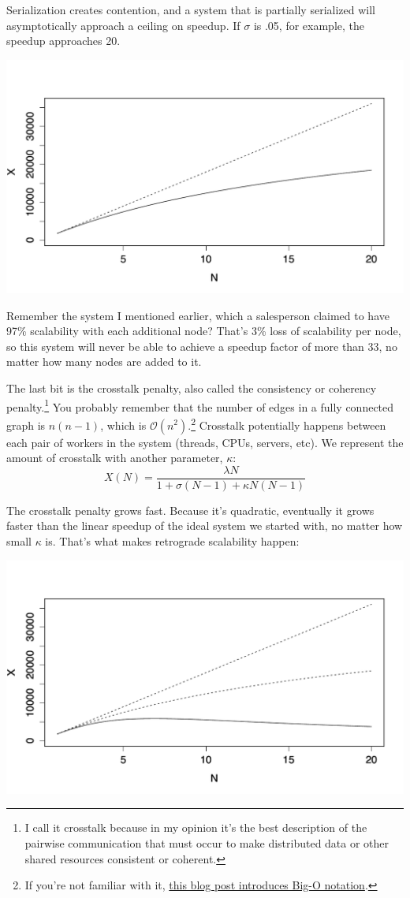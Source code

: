 \documentclass{vivid_layout}
\begin{document}
Serialization creates contention, and a system that is partially serialized will
asymptotically approach a ceiling on speedup. If $\sigma$ is .05, for example,
the speedup approaches 20.
\begin{center}
\includegraphics[width=.85\linewidth]{scalability/amdahl}
\end{center}

Remember the system I mentioned earlier, which a salesperson claimed to have
97\% scalability with each additional node? That's 3\% loss of scalability per
node, so this system will never be able to achieve a speedup factor of more than
33, no matter how many nodes are added to it.

The last bit is the crosstalk penalty, also called the consistency or coherency
penalty.\footnote{I call it crosstalk because in my opinion it's the best
description of the pairwise communication that must occur to make distributed
data or other shared resources consistent or coherent.} You probably remember
that the number of edges in a fully connected graph is $n(n-1)$, which is
$\mathcal{O}(n^2)$.\footnote{If you're not familiar with it,
\href{https://www.vividcortex.com/blog/2013/10/23/big-o-notation-made-simple/}{this
blog post introduces Big-O notation}.} Crosstalk potentially happens between
each pair of workers in the system (threads, CPUs, servers, etc). We represent
the amount of crosstalk with another parameter, $\kappa$:
\[
X(N) = \frac{\lambda N}{1 + \sigma(N-1) + \kappa N(N-1)}
\]

The crosstalk penalty grows fast. Because it's quadratic, eventually it grows
faster than the linear speedup of the ideal system we started with, no matter
how small $\kappa$ is.  That's what makes retrograde scalability happen:
\begin{center}
\includegraphics[width=.85\linewidth]{scalability/usl}
\end{center}
\end{document}
